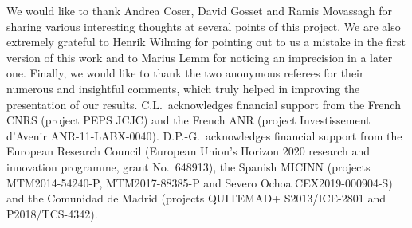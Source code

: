 \documentclass{amsart}
\begin{document}
We would like to thank Andrea Coser, David Gosset and Ramis Movassagh for sharing various interesting thoughts at several points of this project. We are also extremely grateful to Henrik Wilming for pointing out to us a mistake in the first version of this work and to Marius Lemm for noticing an imprecision in a later one. Finally, we would like to thank the two anonymous referees for their numerous and insightful comments, which truly helped in improving the presentation of our results.
C.L.~acknowledges financial support from the French CNRS (project PEPS JCJC) and the French ANR (project Investissement d'Avenir ANR-11-LABX-0040). D.P.-G.~acknowledges financial support from the European Research Council (European Union's Horizon 2020 research and innovation programme, grant No.~648913), the Spanish MICINN (projects MTM2014-54240-P, MTM2017-88385-P and Severo Ochoa CEX2019-000904-S) and the Comunidad de Madrid (projects QUITEMAD+ S2013/ICE-2801 and P2018/TCS-4342).
\end{document}
